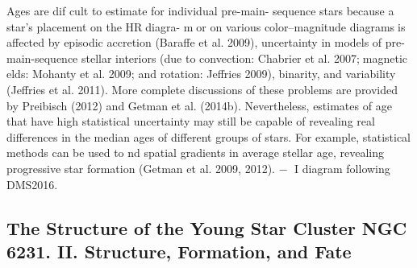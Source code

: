 \documentclass[../Main.tex]{subfiles}
\begin{document}
Ages are dif cult to estimate for individual pre-main-
sequence stars because a star’s placement on the HRdiagra-
mor on various color–magnitude diagramsis affected by
episodic accretion (Baraffe et al. 2009), uncertainty in models
of pre-main-sequence stellar interiors (due to convection:
Chabrier et al. 2007;magnetic elds: Mohanty et al. 2009;
and rotation: Jeffries 2009), binarity, and variability (Jeffries
et al. 2011). More complete discussions of these problems are
provided by Preibisch (2012) and Getman et al. (2014b).
Nevertheless, estimates of age that have high statistical
uncertainty may still be capable of revealing real differences
in the median ages of different groups of stars. For example,
statistical methods can be used to nd spatial gradients in
average stellar age, revealing progressive star formation
(Getman et al. 2009, 2012).
−
I diagram
following DMS2016.

\subsection{The Structure of the Young Star Cluster NGC 6231. II. Structure, Formation, and Fate}

\end{document}
